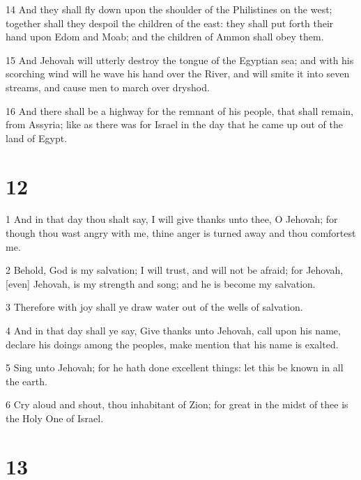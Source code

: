 \par 14 And they shall fly down upon the shoulder of the Philistines on the west; together shall they despoil the children of the east: they shall put forth their hand upon Edom and Moab; and the children of Ammon shall obey them.
\par 15 And Jehovah will utterly destroy the tongue of the Egyptian sea; and with his scorching wind will he wave his hand over the River, and will smite it into seven streams, and cause men to march over dryshod.
\par 16 And there shall be a highway for the remnant of his people, that shall remain, from Assyria; like as there was for Israel in the day that he came up out of the land of Egypt.

\chapter{12}

\par 1 And in that day thou shalt say, I will give thanks unto thee, O Jehovah; for though thou wast angry with me, thine anger is turned away and thou comfortest me.
\par 2 Behold, God is my salvation; I will trust, and will not be afraid; for Jehovah, [even] Jehovah, is my strength and song; and he is become my salvation.
\par 3 Therefore with joy shall ye draw water out of the wells of salvation.
\par 4 And in that day shall ye say, Give thanks unto Jehovah, call upon his name, declare his doings among the peoples, make mention that his name is exalted.
\par 5 Sing unto Jehovah; for he hath done excellent things: let this be known in all the earth.
\par 6 Cry aloud and shout, thou inhabitant of Zion; for great in the midst of thee is the Holy One of Israel.

\chapter{13}

